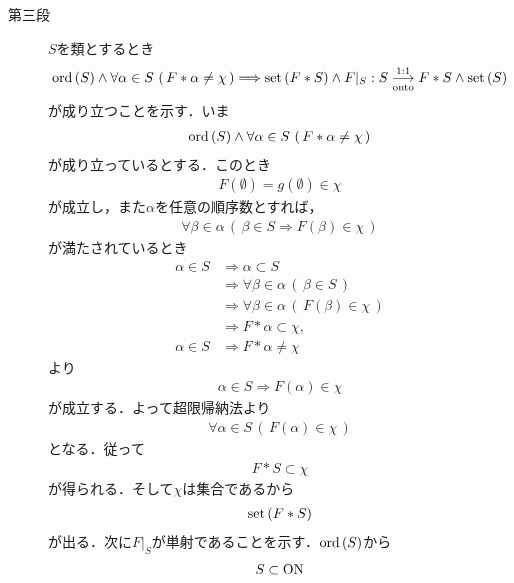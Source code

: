 \begin{prf}
\begin{description}
			\item[第三段]
				$S$を類とするとき
				\begin{align}
					\operatorname*{ord} \left(S\right) \wedge \forall \alpha \in S\, \left(\, F \ast \alpha \neq \chi\, \right)
					\Longrightarrow \operatorname*{set} \left(F \ast S\right) \wedge
					F|_S:S \underset{\mathrm{onto}}{\overset{\mathrm{1:1}}{\longrightarrow}} F \ast S \wedge \operatorname*{set} \left(S\right)
					\label{eq:thm_well_ordering_theorem_1}
				\end{align}
				が成り立つことを示す．いま
				\begin{align}
					\operatorname*{ord} \left(S\right) \wedge \forall \alpha \in S\, \left(\, F \ast \alpha \neq \chi\, \right)
				\end{align}
				が成り立っているとする．このとき
				\begin{align}
					F(\emptyset) = g(\emptyset) \in \chi
				\end{align}
				が成立し，また$\alpha$を任意の順序数とすれば，
				\begin{align}
					\forall \beta \in \alpha\, \left(\, \beta \in S \Longrightarrow F(\beta) \in \chi\, \right)
				\end{align}
				が満たされているとき
				\begin{align}
					\alpha \in S &\Longrightarrow \alpha \subset S \\
					&\Longrightarrow \forall \beta \in \alpha\, (\, \beta \in S\, ) \\
					&\Longrightarrow \forall \beta \in \alpha\, (\, F(\beta) \in \chi\, ) \\
					&\Longrightarrow F \ast \alpha \subset \chi, \\
					\alpha \in S &\Longrightarrow F \ast \alpha \neq \chi
				\end{align}
				より
				\begin{align}
					\alpha \in S \Longrightarrow F(\alpha) \in \chi
				\end{align}
				が成立する．よって超限帰納法より
				\begin{align}
					\forall \alpha \in S\, (\, F(\alpha) \in \chi\, )
				\end{align}
				となる．従って
				\begin{align}
					F \ast S \subset \chi
				\end{align}
				が得られる．そして$\chi$は集合であるから
				\begin{align}
					\operatorname*{set} \left(F \ast S\right)
				\end{align}
				が出る．次に$F|_S$が単射であることを示す．$\operatorname*{ord} \left(S\right)$から
				\begin{align}
					S \subset \mathrm{ON}
				\end{align}

\end{description}
\end{prf}
